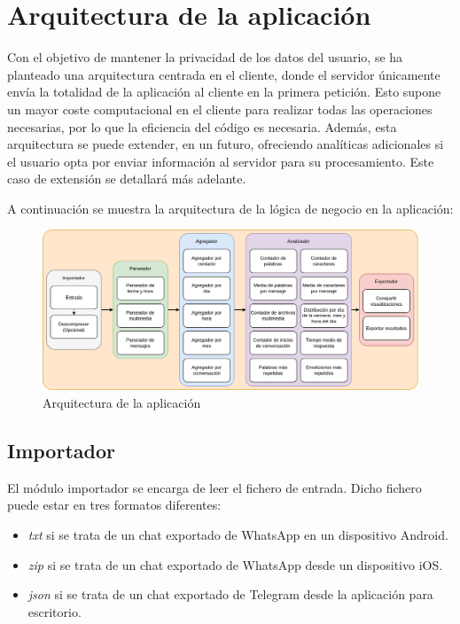 
\section{Arquitectura de la aplicación}
\label{chap:architecture:processing}


Con el objetivo de mantener la privacidad de los datos del usuario, se ha planteado una arquitectura centrada en el cliente, donde el servidor únicamente envía la totalidad de la aplicación al cliente en la primera petición. Esto supone un mayor coste computacional en el cliente para realizar todas las operaciones necesarias, por lo que la eficiencia del código es necesaria. Además, esta arquitectura se puede extender, en un futuro, ofreciendo analíticas adicionales si el usuario opta por enviar información al servidor para su procesamiento. Este caso de extensión se detallará más adelante.

A continuación se muestra la arquitectura de la lógica de negocio en la aplicación:

\begin{figure}[H]
	\centering
	\includegraphics[width=\textwidth]{img/architecture_processing.png}
	\caption{Arquitectura de la aplicación}
	\label{fig:chap4:architecture_processing}
\end{figure}

\subsection{Importador}

El módulo importador se encarga de leer el fichero de entrada. Dicho fichero puede estar en tres formatos diferentes:

\begin{itemize}
	\item \textit{txt} si se trata de un chat exportado de WhatsApp en un dispositivo Android.
	\item \textit{zip} si se trata de un chat exportado de WhatsApp desde un dispositivo iOS.
	\item \textit{\acrshort{json}} si se trata de un chat exportado de Telegram desde la aplicación para escritorio.
\end{itemize}

